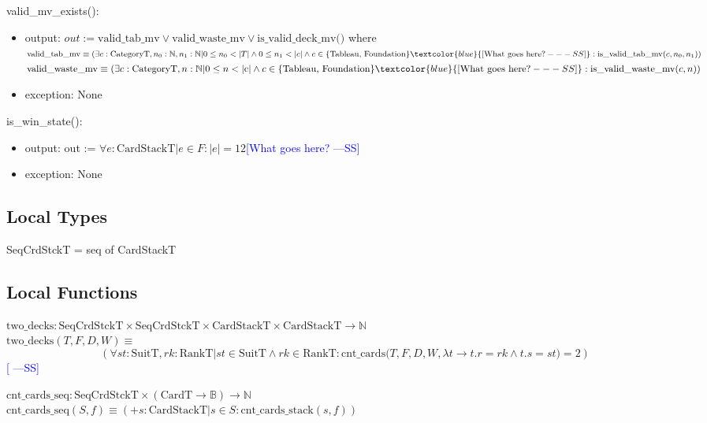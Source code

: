 \documentclass[12pt]{article}
\newcommand{\authornote}[3]{\textcolor{#1}{[#3 ---#2]}}
\newcommand{\authornote}[3]{}
\newcommand{\wss}[1]{\authornote{blue}{SS}{#1}}
\begin{document}
\noindent valid\_mv\_exists():
\begin{itemize}
\item output: $out := \text{valid\_tab\_mv} \vee \text{valid\_waste\_mv} \vee
  \text{is\_valid\_deck\_mv()}$ where\\

  $\text{valid\_tab\_mv} \equiv (\exists c: \text{CategoryT}, n_0: \mathbb{N},
  n_1: \mathbb{N} | 0 \leq n_0 < |T| \land 0 \leq n_1 < |c| \land c \in \{\text{Tableau, Foundation}\} \wss{\text{What goes here?}}: \text{is\_valid\_tab\_mv}(c, n_0, n_1))$\\

  $\text{valid\_waste\_mv} \equiv (\exists c: \text{CategoryT}, n: \mathbb{N} |
   0\leq n < |\text{c}| \land c \in \{\text{Tableau, Foundation}\} \wss{\text{What goes here?}}: \text{is\_valid\_waste\_mv}(c, n))$

\item exception: None

\end{itemize}

\noindent is\_win\_state():
\begin{itemize}
\item output: out := $\forall e : \text{CardStackT} | e \in F : |e| = 12 $\wss{What goes here?}
\item exception: None

\end{itemize}

\subsection*{Local Types}

SeqCrdStckT = seq of CardStackT

\subsection*{Local Functions}

\noindent $\text{two\_decks} : \text{SeqCrdStckT} \times \text{SeqCrdStckT}
\times \text{CardStackT} \times \text{CardStackT} \rightarrow \mathbb{N}$\\
\noindent
$\text{two\_decks}(T, F, D, W) \equiv$$$(\forall \mathit{st}: \text{SuitT}, \mathit{rk}:
\text{RankT} | \mathit{st} \in \text{SuitT} \wedge \mathit{rk} \in \text{RankT}
:\text{cnt\_cards($T, F, D, W, \lambda t \rightarrow t.r = rk \land t.s = st$)} = 2)$$
\wss{}

\noindent $\text{cnt\_cards\_seq}: \text{SeqCrdStckT} \times (\text{CardT}
\rightarrow \mathbb{B}) \rightarrow \mathbb{N}$\\
\noindent $\text{cnt\_cards\_seq}(S, f) \equiv (+ s: \text{CardStackT} | s \in S :
\text{cnt\_cards\_stack}(s, f))$\\
\end{document}
